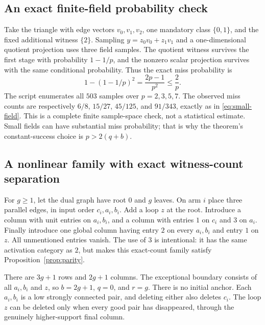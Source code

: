 \documentclass[11pt,letterpaper]{article}
\theoremstyle{definition}
\begin{document}
\subsection{An exact finite-field probability check}
Take the triangle with edge vectors $v_0,v_1,v_2$, one mandatory class
$\{0,1\}$, and the fixed additional witness $\{2\}$. Sampling
$y=z_0v_0+z_1v_1$ and a one-dimensional quotient projection uses three field
samples. The quotient witness survives the first stage with probability
$1-1/p$, and the nonzero scalar projection survives with the same conditional
probability. Thus the exact miss probability is
\begin{equation}\label{eq:small-field}
 1-(1-1/p)^2=\frac{2p-1}{p^2}\leq\frac2p.
\end{equation}
The script enumerates all $503$ samples over $p=2,3,5,7$. The observed miss
counts are respectively $6/8$, $15/27$, $45/125$, and $91/343$, exactly as in
\eqref{eq:small-field}. This is a complete finite sample-space check, not a
statistical estimate. Small fields can have substantial miss probability;
that is why the theorem's constant-success choice is $p>2(q+b)$.

\subsection{A nonlinear family with exact witness-count separation}
For $g\geq1$, let the dual graph have root $0$ and $g$ leaves. On arm $i$
place three parallel edges, in input order $c_i,a_i,b_i$. Add a loop $z$ at
the root. Introduce a column with unit entries on $a_i,b_i$, and a column
with entries $1$ on $c_i$ and $3$ on $a_i$. Finally introduce one global
column having entry $2$ on every $a_i,b_i$ and entry $1$ on $z$. All
unmentioned entries vanish. The use of $3$ is intentional: it has the same
activation category as $2$, but makes this exact-count family satisfy
Proposition~\ref{prop:parity}.

There are $3g+1$ rows and $2g+1$ columns. The exceptional boundary consists
of all $a_i,b_i$ and $z$, so $b=2g+1$, $q=0$, and $r=g$. There is no initial
anchor. Each $a_i,b_i$ is a low strongly connected pair, and deleting either
also deletes $c_i$. The loop $z$ can be deleted only when every good pair
has disappeared, through the genuinely higher-support final column.
\end{document}
